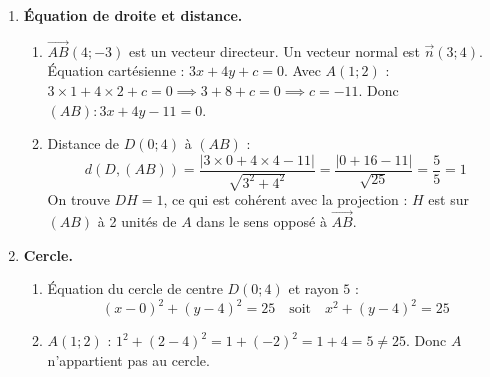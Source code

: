 \documentclass[a4paper,12pt]{article}
\begin{document}
\begin{enumerate}
\begin{enumerate}
Ainsi $AH = |t| \times \|\overrightarrow{AB}\| = \dfrac{2}{5} \times 5 = 2$.
\end{enumerate}

\item \textbf{Équation de droite et distance.}
\begin{enumerate}
\item $\overrightarrow{AB}(4;-3)$ est un vecteur directeur. Un vecteur normal est $\vec{n}(3;4)$.
Équation cartésienne : $3x + 4y + c = 0$. Avec $A(1;2)$ : $3 \times 1 + 4 \times 2 + c = 0 \implies 3 + 8 + c = 0 \implies c = -11$.
Donc $(AB) : 3x + 4y - 11 = 0$.

\item Distance de $D(0;4)$ à $(AB)$ :
\[
d(D, (AB)) = \frac{|3 \times 0 + 4 \times 4 - 11|}{\sqrt{3^2 + 4^2}} = \frac{|0 + 16 - 11|}{\sqrt{25}} = \frac{5}{5} = 1
\]
On trouve $DH = 1$, ce qui est cohérent avec la projection : $H$ est sur $(AB)$ à 2 unités de $A$ dans le sens opposé à $\overrightarrow{AB}$.
\end{enumerate}

\item \textbf{Cercle.}
\begin{enumerate}
\item Équation du cercle de centre $D(0;4)$ et rayon $5$ :
\[
(x - 0)^2 + (y - 4)^2 = 25 \quad \text{soit} \quad x^2 + (y - 4)^2 = 25
\]

\item $A(1;2)$ : $1^2 + (2 - 4)^2 = 1 + (-2)^2 = 1 + 4 = 5 \neq 25$. Donc $A$ n'appartient pas au cercle.
\end{enumerate}
\end{enumerate}

\vspace{1cm}
\end{document}
